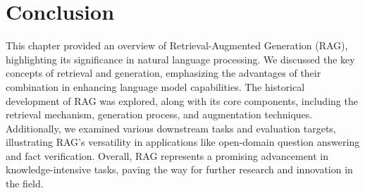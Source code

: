 \section{Conclusion}
This chapter provided an overview of Retrieval-Augmented Generation (RAG), highlighting its significance in natural language processing. We discussed the key concepts of retrieval and generation, emphasizing the advantages of their combination in enhancing language model capabilities. The historical development of RAG was explored, along with its core components, including the retrieval mechanism, generation process, and augmentation techniques. Additionally, we examined various downstream tasks and evaluation targets, illustrating RAG's versatility in applications like open-domain question answering and fact verification. Overall, RAG represents a promising advancement in knowledge-intensive tasks, paving the way for further research and innovation in the field.